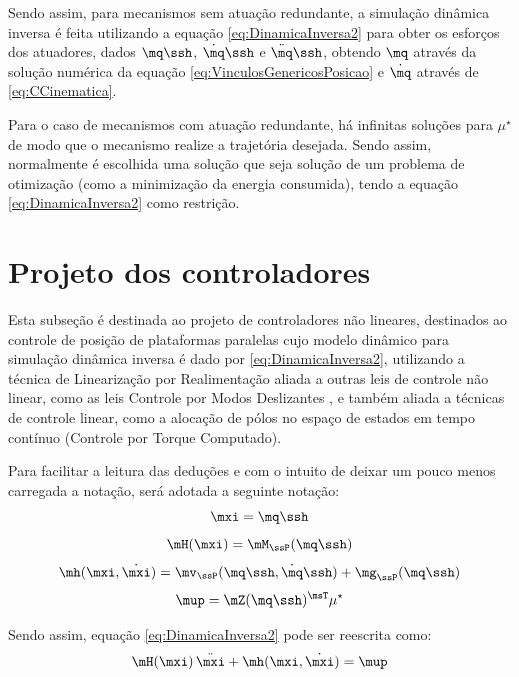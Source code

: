 \documentclass[]{politex}
\begin{document}
Sendo assim, para mecanismos sem atuação redundante, a simulação dinâmica inversa é feita utilizando a equação \eqref{eq:DinamicaInversa2} para obter os esforços dos atuadores, dados $\mq\ssh$, $\dot{\mq}\ssh$ e $\ddot{\mq}\ssh$, obtendo $\mq$ através da solução numérica da equação \eqref{eq:VinculosGenericosPosicao} e $\dot{\mq}$ através de \eqref{eq:CCinematica}. 

Para o caso de mecanismos com atuação redundante, há infinitas soluções para $\mu^\star$ de modo que o mecanismo realize a trajetória desejada. Sendo assim, normalmente é escolhida uma solução que seja solução de um problema de otimização (como a minimização da energia consumida), tendo a equação \eqref{eq:DinamicaInversa2} como restrição.


\chapter{Projeto dos controladores}

Esta subseção é destinada ao projeto de controladores não lineares, destinados ao controle de posição de plataformas paralelas cujo modelo dinâmico para simulação dinâmica inversa é dado por \eqref{eq:DinamicaInversa2}, utilizando a técnica de Linearização por Realimentação aliada a outras leis de controle não linear, como as leis Controle por Modos Deslizantes \cite{Slotini, Utkin}, e também aliada a técnicas de controle linear, como a alocação de pólos no espaço de estados em tempo contínuo (Controle por Torque Computado).

Para facilitar a leitura das deduções e com o intuito de deixar um pouco menos carregada a notação, será adotada a seguinte notação:
\begin{equation}
\mxi = \mq\ssh
\end{equation}
\begin{equation}
\mH(\mxi) = \mM_{\ssP}(\mq\ssh)
\end{equation}
\begin{equation}
\mh(\mxi, \dot{\mxi}) = \mv_{\ssP}(\mq\ssh, \dot{\mq}\ssh) + \mg_{\ssP}(\mq\ssh)
\end{equation}
\begin{equation}
\mup = \mZ(\mq\ssh)^{\msT} \mu^\star
\end{equation}

Sendo assim, equação \eqref{eq:DinamicaInversa2} pode ser reescrita como:
\begin{equation} \label{eq:ModeloControle}
\mH(\mxi) \, \ddot{\mxi} + \mh(\mxi,\dot{\mxi}) = \mup
\end{equation}
\end{document}

